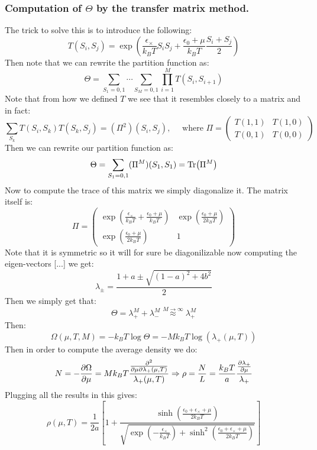 \documentclass[10pt,a4paper]{book}
\begin{document}
\subsubsection{Computation of $\Theta$ by the transfer matrix method.}
The trick to solve this is to introduce the following:
\[
T(S_i, S_j) = \exp(\frac{\epsilon_\times}{k_B T} S_i S_j + \frac{\epsilon_0 + \mu}{k_B T} \frac{S_i + S_j}{2})
\]
Then note that we can rewrite the partition function as:
\[
\Theta = \sum_{S_1 = 0, 1}\cdots\sum_{S_M = 0, 1} \prod_{i = 1}^M T(S_i,S_{i+1})
\]
Note that from how we defined $T$ we see that it resembles closely to a matrix and in fact:
\[
\sum_{S_k} T(S_i, S_k) T(S_k ,S_j) = (\Pi^2) (S_i, S_j), \quad \text{ where } \Pi = \begin{pmatrix}
T(1, 1) & T(1, 0)\\
T(0, 1) & T(0, 0)
\end{pmatrix}
\]
Then we can rewrite our partition function as:
\[
\Theta = \sum_{S_1 = 0,1} (\Pi^M ) (S_1, S_1) = \Tr (\Pi^M)
\]
Now to compute the trace of this matrix we simply diagonalize it. The matrix itself is:
\[
\Pi = \begin{pmatrix}
\exp(\frac{\epsilon_\times}{k_B T} + \frac{\epsilon_0 + \mu}{k_B T}) & \exp(\frac{\epsilon_0 + \mu}{2 k_B T})\\
\exp(\frac{\epsilon_0 + \mu}{2 k_B T}) & 1
\end{pmatrix}
\]
Note that it is symmetric so it will for sure be diagonilizable now computing the eigen-vectors [...] we get:
\[
\lambda_{\pm} = \frac{1 + a \pm \sqrt{(1 - a)^2 + 4b^2}}{2}
\]
Then we simply get that:
\[
\Theta = \lambda_+^M + \lambda_-^M \stackrel{M \to \infty}{\approx} \lambda_+^M
\]
Then:
\[
\Omega(\mu, T, M) = - k_B T \log \Theta = - M k_B T \log(\lambda_+(\mu, T))
\]
Then in order to compute the average density we do:
\[
N = - \pdv{\Omega}{\mu} = M k_B T \frac{\pdv{}{\mu} {\lambda_+ (\mu, T)}}{\lambda_+(\mu, T)} \Rightarrow \rho = \frac{N}{L} = \frac{k_B T}{a} \frac{\pdv{\lambda_+}{\mu}}{\lambda_+}
\]
Plugging all the results in this gives:
\[
\rho(\mu, T) = \frac{1}{2 a} \left[ 1 + \frac{\sinh(\frac{\epsilon_0 + \epsilon_\times + \mu}{2 k_B T})}{\sqrt{\exp({-\frac{\epsilon_\times}{k_B T}}) + \sinh^2(\frac{\epsilon_0 + \epsilon_\times + \mu}{2 k_B T})}} \right]
\]
\end{document}
